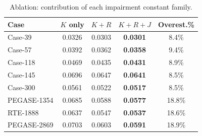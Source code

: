 \begin{table}[t]
\centering
\caption{Ablation: contribution of each impairment constant family.}
\label{tab:ablation}
\begin{tabular}{lcccc}
\toprule
Case & $K$ only & $K{+}R$ & $K{+}R{+}J$ & Overest.\% \\
\midrule
Case-39 & 0.0326 & 0.0303 & \textbf{0.0301} & 8.4\% \\
Case-57 & 0.0392 & 0.0362 & \textbf{0.0358} & 9.4\% \\
Case-118 & 0.0469 & 0.0435 & \textbf{0.0431} & 8.9\% \\
Case-145 & 0.0696 & 0.0647 & \textbf{0.0641} & 8.5\% \\
Case-300 & 0.0561 & 0.0522 & \textbf{0.0517} & 8.5\% \\
PEGASE-1354 & 0.0685 & 0.0588 & \textbf{0.0577} & 18.8\% \\
RTE-1888 & 0.0637 & 0.0547 & \textbf{0.0537} & 18.6\% \\
PEGASE-2869 & 0.0703 & 0.0603 & \textbf{0.0591} & 18.9\% \\
\bottomrule
\end{tabular}
\end{table}